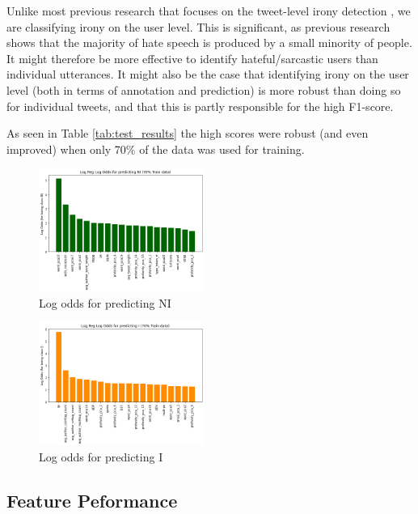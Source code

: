 Unlike most previous research that focuses on the tweet-level irony detection \cite{sarcasm_detection}, we are classifying irony on the user level. This is significant, as previous research \cite{cyberbullying} shows that the majority of hate speech is produced by a small minority of people. It might therefore be more effective to identify hateful/sarcastic users than individual utterances. It might also be the case that identifying irony on the user level (both in terms of annotation and prediction) is more robust than doing so for individual tweets, and that this is partly responsible for the high F1-score. 

As seen in Table \ref{tab:test_results} the high scores were robust (and even improved) when only 70\% of the data was used for training. 

\begin{figure}[!h]
    \centering
    \includegraphics[width=0.48\textwidth]{images/NI_features_log_reg_odds.png}
    \caption{Log odds for predicting NI}
    \label{fig:ni_log_odds}
\end{figure}

\begin{figure}[!h]
    \centering
    \includegraphics[width=0.48\textwidth]{images/I_features_log_reg_odds.png}
    \caption{Log odds for predicting I}
    \label{fig:i_log_odds}
\end{figure}

\subsection{Feature Peformance}

